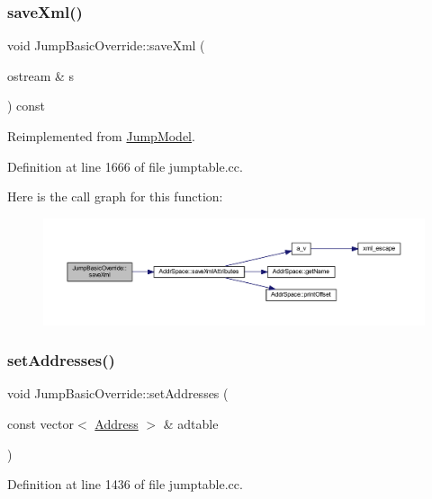 \subsubsection{\texorpdfstring{saveXml()}{saveXml()}}
{\footnotesize\ttfamily void Jump\+Basic\+Override\+::save\+Xml (\begin{DoxyParamCaption}\item[{ostream \&}]{s }\end{DoxyParamCaption}) const\hspace{0.3cm}{\ttfamily [virtual]}}



Reimplemented from \mbox{\hyperlink{class_jump_model_a014148fe25655a7399bce14af4ae1ed8}{Jump\+Model}}.



Definition at line 1666 of file jumptable.\+cc.

Here is the call graph for this function\+:
\nopagebreak
\begin{figure}[H]
\begin{center}
\leavevmode
\includegraphics[width=350pt]{class_jump_basic_override_a62070a61c5ab32dbc287c7b32e74bd64_cgraph}
\end{center}
\end{figure}
\mbox{\label{class_jump_basic_override_add96a354fac8785292195cb321899544}} 
\subsubsection{\texorpdfstring{setAddresses()}{setAddresses()}}
{\footnotesize\ttfamily void Jump\+Basic\+Override\+::set\+Addresses (\begin{DoxyParamCaption}\item[{const vector$<$ \mbox{\hyperlink{class_address}{Address}} $>$ \&}]{adtable }\end{DoxyParamCaption})}



Definition at line 1436 of file jumptable.\+cc.


